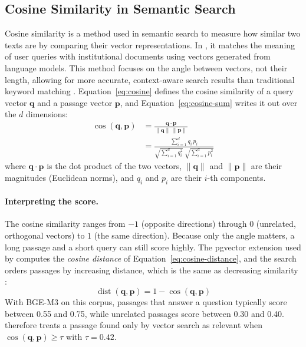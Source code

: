 \subsection{Cosine Similarity in Semantic Search}\label{sec:cosine}

Cosine similarity is a method used in semantic search to measure how similar two texts are by comparing their vector representations. In \cs{}, it matches the meaning of user queries with institutional documents using vectors generated from language models. This method focuses on the angle between vectors, not their length, allowing for more accurate, context-aware search results than traditional keyword matching \citep{huang2008}. Equation~\ref{eq:cosine} defines the cosine similarity of a query vector $\mathbf{q}$ and a passage vector $\mathbf{p}$, and Equation~\ref{eq:cosine-sum} writes it out over the $d$ dimensions:
\begin{align}
  \cos(\mathbf{q}, \mathbf{p}) &= \frac{\mathbf{q} \cdot \mathbf{p}}{\lVert \mathbf{q} \rVert \, \lVert \mathbf{p} \rVert} \label{eq:cosine}\\[4pt]
  &= \frac{\sum_{i=1}^{d} q_i \, p_i}{\sqrt{\sum_{i=1}^{d} q_i^{2}} \; \sqrt{\sum_{i=1}^{d} p_i^{2}}} \label{eq:cosine-sum}
\end{align}
where $\mathbf{q} \cdot \mathbf{p}$ is the dot product of the two vectors, $\lVert \mathbf{q} \rVert$ and $\lVert \mathbf{p} \rVert$ are their magnitudes (Euclidean norms), and $q_i$ and $p_i$ are their $i$-th components.

\paragraph{Interpreting the score.} The cosine similarity ranges from $-1$ (opposite directions) through $0$ (unrelated, orthogonal vectors) to $1$ (the same direction). Because only the angle matters, a long passage and a short query can still score highly. The pgvector extension used by \cs{} computes the \emph{cosine distance} of Equation~\ref{eq:cosine-distance}, and the search orders passages by increasing distance, which is the same as decreasing similarity \citep{pgvector2024}:
\begin{equation}
  \operatorname{dist}(\mathbf{q}, \mathbf{p}) = 1 - \cos(\mathbf{q}, \mathbf{p}) \label{eq:cosine-distance}
\end{equation}
With BGE-M3 on this corpus, passages that answer a question typically score between 0.55 and 0.75, while unrelated passages score between 0.30 and 0.40. \cs{} therefore treats a passage found only by vector search as relevant when $\cos(\mathbf{q},\mathbf{p}) \ge \tau$ with $\tau = 0.42$.

